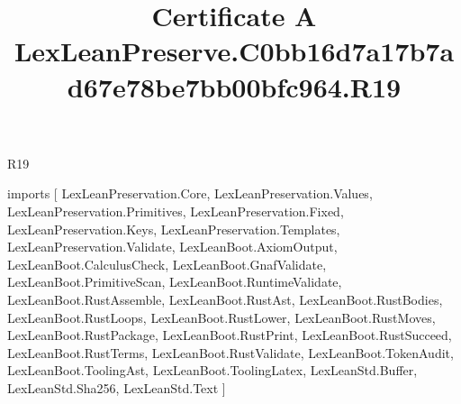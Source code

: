 \begin{lexlean}{R19}
\title{Certificate A LexLeanPreserve.C0bb16d7a17b7ad67e78be7bb00bfc964.R19}
\begin{coremodule}
imports [
  LexLeanPreservation.Core,
  LexLeanPreservation.Values,
  LexLeanPreservation.Primitives,
  LexLeanPreservation.Fixed,
  LexLeanPreservation.Keys,
  LexLeanPreservation.Templates,
  LexLeanPreservation.Validate,
  LexLeanBoot.AxiomOutput,
  LexLeanBoot.CalculusCheck,
  LexLeanBoot.GnafValidate,
  LexLeanBoot.PrimitiveScan,
  LexLeanBoot.RuntimeValidate,
  LexLeanBoot.RustAssemble,
  LexLeanBoot.RustAst,
  LexLeanBoot.RustBodies,
  LexLeanBoot.RustLoops,
  LexLeanBoot.RustLower,
  LexLeanBoot.RustMoves,
  LexLeanBoot.RustPackage,
  LexLeanBoot.RustPrint,
  LexLeanBoot.RustSucceed,
  LexLeanBoot.RustTerms,
  LexLeanBoot.RustValidate,
  LexLeanBoot.TokenAudit,
  LexLeanBoot.ToolingAst,
  LexLeanBoot.ToolingLatex,
  LexLeanStd.Buffer,
  LexLeanStd.Sha256,
  LexLeanStd.Text
]


\end{coremodule}
\end{lexlean}
